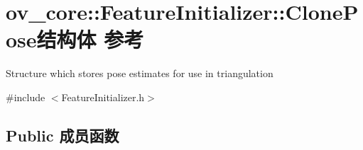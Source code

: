 \hypertarget{structov__core_1_1FeatureInitializer_1_1ClonePose}{}\section{ov\+\_\+core\+:\+:Feature\+Initializer\+:\+:Clone\+Pose结构体 参考}
\label{structov__core_1_1FeatureInitializer_1_1ClonePose}


Structure which stores pose estimates for use in triangulation  




{\ttfamily \#include $<$Feature\+Initializer.\+h$>$}

\subsection*{Public 成员函数}
